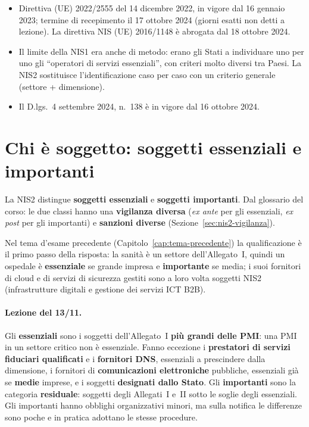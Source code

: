 \begin{integrazione}
\begin{itemize}
  \item Direttiva (UE) 2022/2555 del 14 dicembre 2022, in vigore dal 16 gennaio 2023; termine di
    recepimento il 17 ottobre 2024 (giorni esatti non detti a lezione). La direttiva NIS (UE) 2016/1148 è abrogata dal 18 ottobre 2024.
  \item Il limite della NIS1 era anche di metodo: erano gli Stati a individuare uno per uno gli
    ``operatori di servizi essenziali'', con criteri molto diversi tra Paesi. La NIS2 sostituisce
    l'identificazione caso per caso con un criterio generale (settore + dimensione).
  \item Il D.lgs.~4 settembre 2024, n.~138 è in vigore dal 16 ottobre 2024.
\end{itemize}
\end{integrazione}

\section{Chi è soggetto: soggetti essenziali e importanti}
\label{sec:nis2-ambito}

La NIS2 distingue \textbf{soggetti essenziali} e \textbf{soggetti importanti}. Dal glossario del corso:
le due classi hanno una \textbf{vigilanza diversa} (\emph{ex ante} per gli essenziali, \emph{ex post}
per gli importanti) e \textbf{sanzioni diverse} (Sezione~\ref{sec:nis2-vigilanza}).

Nel tema d'esame precedente (Capitolo~\ref{cap:tema-precedente}) la qualificazione è il primo passo
della risposta: la sanità è un settore dell'Allegato~I, quindi un ospedale è \textbf{essenziale} se
grande impresa e \textbf{importante} se media; i suoi fornitori di cloud e di servizi di sicurezza
gestiti sono a loro volta soggetti NIS2 (infrastrutture digitali e gestione dei servizi ICT B2B).

\paragraph{Lezione del 13/11.} Gli \textbf{essenziali} sono i soggetti dell'Allegato~I \textbf{più
grandi delle PMI}: una PMI in un settore critico non è essenziale. Fanno eccezione i
\textbf{prestatori di servizi fiduciari qualificati} e i \textbf{fornitori DNS}, essenziali a
prescindere dalla dimensione, i fornitori di \textbf{comunicazioni elettroniche} pubbliche, essenziali
già se \textbf{medie} imprese, e i soggetti \textbf{designati dallo Stato}. Gli \textbf{importanti} sono
la categoria \textbf{residuale}: soggetti degli Allegati~I e~II sotto le soglie degli essenziali. Gli
importanti hanno obblighi organizzativi minori, ma sulla notifica le differenze sono poche e in pratica
adottano le stesse procedure.

